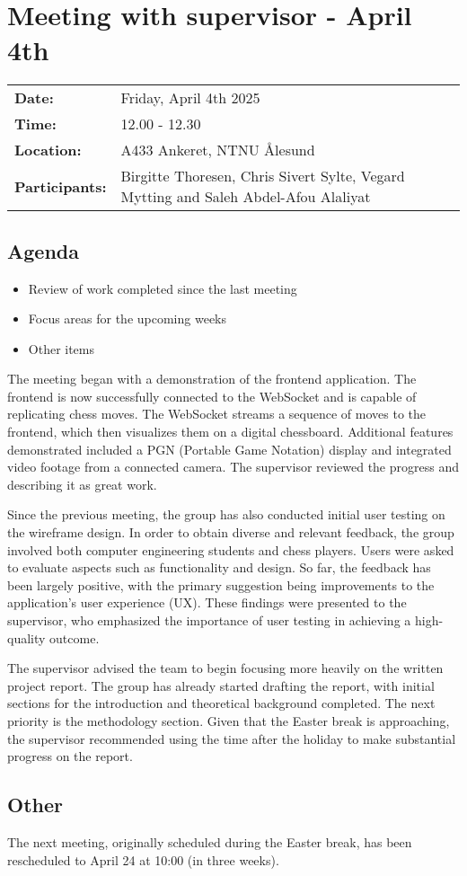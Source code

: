 \section{Meeting with supervisor - April 4th}
\begin{tabular}{ll}
    \textbf{Date:} & Friday, April 4th 2025 \\
    \textbf{Time:} & 12.00 - 12.30\\
    \textbf{Location:} & A433 Ankeret, NTNU Ålesund \\
    \textbf{Participants:} & Birgitte Thoresen, Chris Sivert Sylte, Vegard Mytting and Saleh Abdel-Afou Alaliyat\\
\end{tabular}

\vspace{0.5cm}

\subsection{Agenda}

\begin{itemize} 
    \item Review of work completed since the last meeting
    \item Focus areas for the upcoming weeks
    \item Other items
\end{itemize}

The meeting began with a demonstration of the frontend application. The frontend is now successfully connected to the WebSocket and is capable of replicating chess moves. The WebSocket streams a sequence of moves to the frontend, which then visualizes them on a digital chessboard. Additional features demonstrated included a PGN (Portable Game Notation) display and integrated video footage from a connected camera. The supervisor reviewed the progress and describing it as great work.

Since the previous meeting, the group has also conducted initial user testing on the wireframe design. In order to obtain diverse and relevant feedback, the group involved both computer engineering students and chess players. Users were asked to evaluate aspects such as functionality and design. So far, the feedback has been largely positive, with the primary suggestion being improvements to the application's user experience (UX). These findings were presented to the supervisor, who emphasized the importance of user testing in achieving a high-quality outcome.

The supervisor advised the team to begin focusing more heavily on the written project report. The group has already started drafting the report, with initial sections for the introduction and theoretical background completed. The next priority is the methodology section. Given that the Easter break is approaching, the supervisor recommended using the time after the holiday to make substantial progress on the report.

\subsection{Other}
The next meeting, originally scheduled during the Easter break, has been rescheduled to April 24 at 10:00 (in three weeks).
